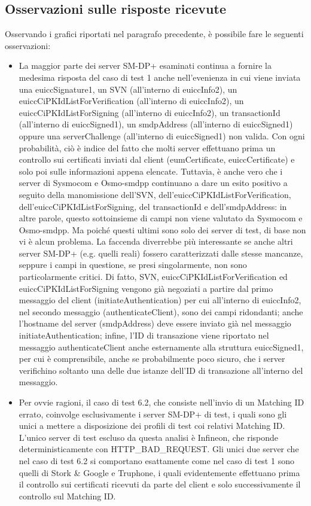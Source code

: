 \documentclass[10pt, oneside]{book}
\begin{document}
\subsection{Osservazioni sulle risposte ricevute}
Osservando i grafici riportati nel paragrafo precedente, è possibile fare le seguenti osservazioni:
\begin{itemize}
\item La maggior parte dei server SM-DP+ esaminati continua a fornire la medesima risposta del caso di test 1 anche nell'evenienza in cui viene inviata una euiccSignature1, un SVN (all'interno di euiccInfo2), un euiccCiPKIdListForVerification (all'interno di euiccInfo2), un euiccCiPKIdListForSigning (all'interno di euiccInfo2), un transactionId (all'interno di euiccSigned1), un smdpAddress (all'interno di euiccSigned1) oppure una serverChallenge (all'interno di euiccSigned1) non valida. Con ogni probabilità, ciò è indice del fatto che molti server effettuano prima un controllo sui certificati inviati dal client (eumCertificate, euiccCertificate) e solo poi sulle informazioni appena elencate. Tuttavia, è anche vero che i server di Sysmocom e Osmo-smdpp continuano a dare un esito positivo a seguito della manomissione dell'SVN, dell'euiccCiPKIdListForVerification, dell'euiccCiPKIdListForSigning, del transactionId e dell'smdpAddress: in altre parole, questo sottoinsieme di campi non viene valutato da Sysmocom e Osmo-smdpp. Ma poiché questi ultimi sono solo dei server di test, di base non vi è alcun problema. La faccenda diverrebbe più interessante se anche altri server SM-DP+ (e.g. quelli reali) fossero caratterizzati dalle stesse mancanze, seppure i campi in questione, se presi singolarmente, non sono particolarmente critici. Di fatto, SVN, euiccCiPKIdListForVerification ed euiccCiPKIdListForSigning vengono già negoziati a partire dal primo messaggio del client (initiateAuthentication) per cui all'interno di euiccInfo2, nel secondo messaggio (authenticateClient), sono dei campi ridondanti; anche l'hostname del server (smdpAddress) deve essere inviato già nel messaggio initiateAuthentication; infine, l'ID di transazione viene riportato nel messaggio authenticateClient anche esternamente alla struttura euiccSigned1, per cui è comprensibile, anche se probabilmente poco sicuro, che i server verifichino soltanto una delle due istanze dell'ID di transazione all'interno del messaggio.
\item Per ovvie ragioni, il caso di test 6.2, che consiste nell'invio di un Matching ID errato, coinvolge esclusivamente i server SM-DP+ di test, i quali sono gli unici a mettere a disposizione dei profili di test coi relativi Matching ID. L'unico server di test escluso da questa analisi è Infineon, che risponde deterministicamente con HTTP\_BAD\_REQUEST. Gli unici due server che nel caso di test 6.2 si comportano esattamente come nel caso di test 1 sono quelli di Stork \& Google e Truphone, i quali evidentemente effettuano prima il controllo sui certificati ricevuti da parte del client e solo successivamente il controllo sul Matching ID.

\end{itemize}
\end{document}
